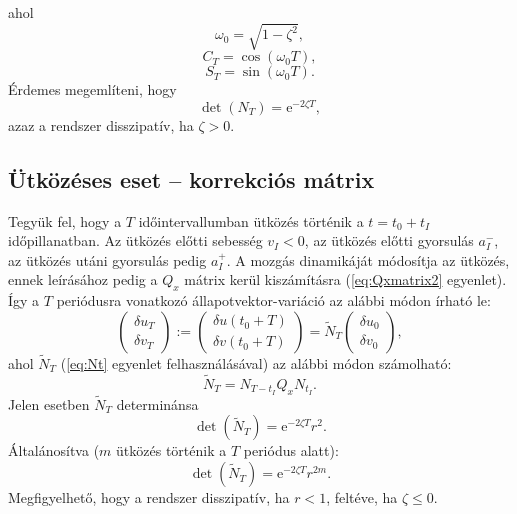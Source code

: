 ahol 
\begin{equation}
\omega_0=\sqrt{1-\zeta^2},
\end{equation}
\begin{equation}
C_T=\cos(\omega_0T),
\end{equation}
\begin{equation}
S_T=\sin(\omega_0T).
\end{equation}
Érdemes megemlíteni, hogy 
\begin{equation}
\det\left(N_T \right)=\mathrm{e}^{-2\zeta T},
\end{equation}
azaz a rendszer disszipatív, ha $\zeta>0$.

\subsection{Ütközéses eset -- korrekciós mátrix}

Tegyük fel, hogy a $T$ időintervallumban ütközés történik a $t=t_0+t_I$ időpillanatban. Az ütközés előtti sebesség $v_I<0$, az ütközés előtti gyorsulás $a_I^-$, az ütközés utáni gyorsulás pedig $a_I^+$. A mozgás dinamikáját módosítja az ütközés, ennek leírásához pedig a $Q_x$ mátrix kerül kiszámításra (\eqref{eq:Qxmatrix2} egyenlet). Így a $T$ periódusra vonatkozó állapotvektor-variáció az alábbi módon írható le:
\begin{equation}
\begin{pmatrix}
\delta u_T\\ \delta v_T
\end{pmatrix}:=
\begin{pmatrix}
\delta u(t_0+T)\\
\delta v(t_0+T)
\end{pmatrix}
=\tilde{N}_T\begin{pmatrix}
\delta u_0\\ \delta v_0
\end{pmatrix},
\end{equation}
ahol $\tilde{N}_T$ (\eqref{eq:Nt} egyenlet felhasználásával) az alábbi módon számolható:
\begin{equation}
\tilde{N}_T=N_{T-t_I}Q_xN_{t_I}.
\end{equation}
Jelen esetben $\tilde{N}_T$ determinánsa
\begin{equation}
\det\left( \tilde{N}_T\right)=\mathrm{e}^{-2\zeta T}r^2.
\end{equation}
Általánosítva ($m$ ütközés történik a $T$ periódus alatt):
\begin{equation}
\det\left(\tilde{N}_T \right)=\mathrm{e}^{-2\zeta T}r^{2m}.
\end{equation}
Megfigyelhető, hogy a rendszer disszipatív, ha $r<1$, feltéve, ha $\zeta \leq 0$.


